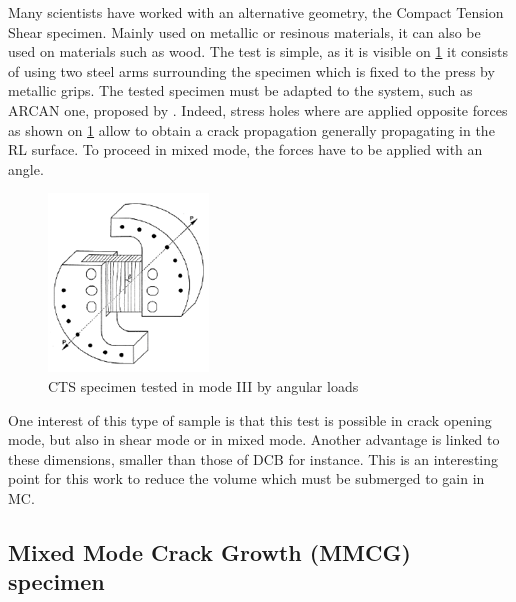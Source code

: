 Many scientists have worked with an alternative geometry, the Compact Tension Shear specimen. Mainly used on metallic or resinous materials, it can also be used on materials such as wood. The test is simple, as it is visible on \ref{fig:CTS} it consists of using two steel arms surrounding the specimen which is fixed to the press by metallic grips. The tested specimen must be adapted to the system, such as ARCAN one, proposed by \parencite{Reference6}. Indeed, stress holes where are applied opposite forces as shown on \ref{fig:CTS} allow to obtain a crack propagation generally propagating in the RL surface. To proceed in mixed mode, the forces have to be applied with an angle. 
\begin{figure}[h]
	\centering
	\includegraphics{Figures/Specimen_test}
	\decoRule
	\caption[CTS specimen]{CTS specimen tested in mode III by angular loads}
	\label{fig:CTS}
\end{figure}
One interest of this type of sample is that this test is possible in crack opening mode, but also in shear mode or in mixed mode. Another  advantage is linked to these dimensions, smaller than those of DCB for instance. This is an interesting point for this work to reduce the volume which must be submerged to gain in MC.

\subsection{ Mixed Mode Crack Growth (MMCG) specimen}

